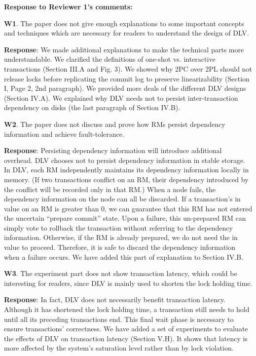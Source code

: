 \documentclass[conference]{IEEEtran}
\begin{document}
\begin{frame}{\relax}
  \textbf{Response to Reviewer 1’s comments:}

\textbf{W1}. The paper does not give enough explanations to some important concepts and techniques which are necessary for readers to understand the design of DLV.

\textbf{Response}: We made additional explanations to make the technical parts more understandable. We clarified the definitions of one-shot vs. interactive transactions (Section III.A and Fig. 3). We showed why 2PC over 2PL should not release locks before replicating the commit log to preserve linearizability (Section I, Page 2, 2nd paragraph). We provided more deals of the different DLV designs (Section IV.A). We explained why DLV needs not to persist inter-transaction dependency on disks (the last paragraph of Section IV.B).

\textbf{W2}. The paper does not discuss and prove how RMs persist dependency information and achieve fault-tolerance.

\textbf{Response}: Persisting dependency information will introduce additional overhead. DLV chooses not to persist dependency information in stable storage. In DLV, each RM independently maintains its dependency information locally in memory. (If two transactions conflict on an RM, their dependency introduced by the conflict will be recorded only in that RM.) When a node fails, the dependency information on the node can all be discarded. If a transaction’s in value on an RM is greater than 0, we can guarantee that this RM has not entered the uncertain “prepare commit” state. Upon a failure, this un-prepared RM can simply vote to rollback the transaction without referring to the dependency information. Otherwise, if the RM is already prepared, we do not need the in value to proceed. Therefore, it is safe to discard the dependency information when a failure occurs. We have added this part of explanation to Section IV.B.

\textbf{W3}. The experiment part does not show transaction latency, which could be interesting for readers, since DLV is mainly used to shorten the lock holding time.

\textbf{Response}: In fact, DLV does not necessarily benefit transaction latency. Although it has shortened the lock holding time, a transaction still needs to hold until all its preceding transactions end. This final wait phase is necessary to ensure transactions' correctness. We have added a set of experiments to evaluate the effects of DLV on transaction latency (Section V.H). It shows that latency is more affected by the system's saturation level rather than by lock violation.


\end{frame}
\end{document}

